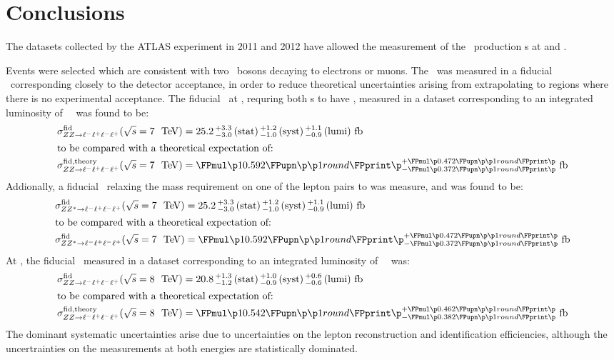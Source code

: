 \graphicspath{{Chapters/Conclusions/Figures/}}
\chapter{Conclusions}
\label{chap:Conclusions}
The datasets collected by the ATLAS experiment in 2011 and 2012 have allowed the
measurement of the \ZZ\ production \cx s at  and .

Events were selected which are consistent with two \Z\ bosons decaying to
electrons or muons. The \cx\ was measured in a fiducial \phasespace\ corresponding closely to the detector
acceptance, in order to reduce theoretical uncertainties arising from
extrapolating to regions where there is no experimental acceptance.
The fiducial \cx\ at , requring both \leppair s to have \sstooos, measured in a
dataset corresponding to an integrated luminosity of
\LumiPassGRLTwentyEleven~\ifb\ was found to be:
\begin{align}
\sigmaFidZZllll(\sqrtseq{7}) &= \ZZSevenTeVFiducialCrossSectionZZLLLL \\
\intertext{to be compared with a theoretical expectation of:}
\sigmaFidTheoryZZllll(\sqrtseq{7}) &= \ZZSevenTeVTheoryFiducialCrossSectionZZLLLL
\end{align}
Addionally, a fiducial \cx\ relaxing the mass requirement on one of the lepton pairs
to \mllgtt was measure, and was found to be:
\begin{align}
\sigmaFidZZsllll(\sqrtseq{7}) &= \ZZSevenTeVFiducialCrossSectionZZLLLL \\
\intertext{to be compared with a theoretical expectation of:}
\sigmaFidZZsllll(\sqrtseq{7}) &= \ZZSevenTeVTheoryFiducialCrossSectionZZLLLL
\end{align}
At , the fiducial \cx\ measured in a dataset corresponding to an integrated luminosity of
\LumiPassGRLTwentyTwelve~\ifb\ was:
\begin{align}
\sigmaFidZZllll(\sqrtseq{8}) &= \ZZEightTeVFiducialCrossSectionZZLLLL \\
\intertext{to be compared with a theoretical expectation of:}
\sigmaFidTheoryZZllll(\sqrtseq{8}) &= \ZZEightTeVTheoryFiducialCrossSectionZZLLLL
\end{align}
The dominant systematic uncertainties arise due to uncertainties on the lepton
reconstruction and identification efficiencies, although the uncertrainties on
the measurements at both energies are statistically dominated.

